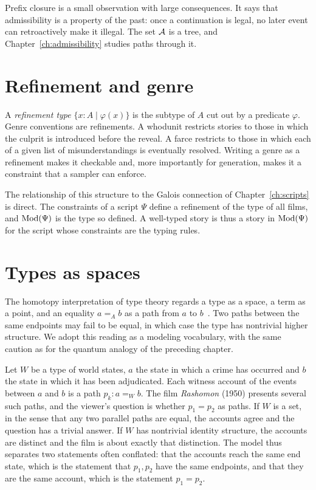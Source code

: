 Prefix closure is a small observation with large consequences. It says that admissibility is a property of the past: once a continuation is legal, no later event can retroactively make it illegal. The set $\mathcal{A}$ is a tree, and Chapter~\ref{ch:admissibility} studies paths through it.

\section{Refinement and genre}

A \emph{refinement type} $\{x:A\mid\varphi(x)\}$ is the subtype of $A$ cut out by a predicate $\varphi$. Genre conventions are refinements. A whodunit restricts stories to those in which the culprit is introduced before the reveal. A farce restricts to those in which each of a given list of misunderstandings is eventually resolved. Writing a genre as a refinement makes it checkable and, more importantly for generation, makes it a constraint that a sampler can enforce.

The relationship of this structure to the Galois connection of Chapter~\ref{ch:scripts} is direct. The constraints of a script $\Psi$ define a refinement of the type of all films, and $\operatorname{Mod}(\Psi)$ is the type so defined. A well-typed story is thus a story in $\operatorname{Mod}(\Psi)$ for the script whose constraints are the typing rules.

\section{Types as spaces}

The homotopy interpretation of type theory regards a type as a space, a term as a point, and an equality $a=_Ab$ as a path from $a$ to $b$~\cite{hottbook2013}. Two paths between the same endpoints may fail to be equal, in which case the type has nontrivial higher structure. We adopt this reading as a modeling vocabulary, with the same caution as for the quantum analogy of the preceding chapter.

\begin{example}[Rashomon]\label{ex:rashomon}
Let $W$ be a type of world states, $a$ the state in which a crime has occurred and $b$ the state in which it has been adjudicated. Each witness account of the events between $a$ and $b$ is a path $p_k:a=_Wb$. The film \emph{Rashomon} (1950) presents several such paths, and the viewer's question is whether $p_1=p_2$ as paths. If $W$ is a set, in the sense that any two parallel paths are equal, the accounts agree and the question has a trivial answer. If $W$ has nontrivial identity structure, the accounts are distinct and the film is about exactly that distinction. The model thus separates two statements often conflated: that the accounts reach the same end state, which is the statement that $p_1,p_2$ have the same endpoints, and that they are the same account, which is the statement $p_1=p_2$.
\end{example}

